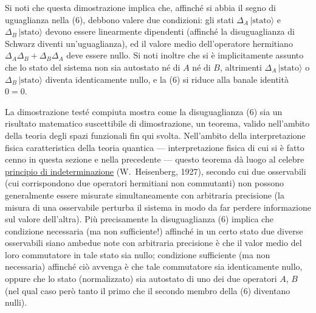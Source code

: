 \documentclass[11pt, a4paper]{book}
\numberwithin{equation}{section}
\begin{document}
Si noti che questa dimostrazione implica che, affinché si abbia
il segno di uguaglianza nella (6), debbono valere due condizioni: gli
stati $\Delta_A\,|\text{stato}\rangle$ e $\Delta_B\,|\text{stato}\rangle$ devono essere linearmente dipendenti
(affinché la disuguaglianza di Schwarz diventi un'uguaglianza), ed il valore medio dell'operatore hermitiano $\Delta_A \Delta_B + \Delta_B \Delta_A$ deve essere
nullo. Si noti inoltre che si è implicitamente assunto che lo stato del sistema non sia autostato né di $A$ né di $B$, altrimenti $\Delta_A\,|\text{stato}\rangle$ o
$\Delta_B\,|\text{stato}\rangle$ diventa identicamente nullo, e la (6) si riduce alla banale
identità $0 = 0$.


La dimostrazione testé compiuta mostra come la disuguaglianza (6) sia un risultato matematico suscettibile di dimostrazione, un
teorema, valido nell'ambito della teoria degli spazi funzionali fin qui
svolta. Nell'ambito della interpretazione fisica caratteristica della teoria quantica --- interpretazione fisica di cui si è fatto cenno in questa
sezione e nella precedente --- questo teorema dà luogo al celebre \underline{principio
di indeterminazione} (W.\ Heisenberg, 1927), secondo cui due osservabili
(cui corrispondono due operatori hermitiani non commutanti) non possono
generalmente essere misurate simultaneamente con arbitraria precisione
(la misura di una osservabile perturba il sistema in modo da far perdere
informazione sul valore dell'altra). Più precisamente la disuguaglianza (6)
implica che condizione necessaria (ma non sufficiente!) affinché in un certo stato due diverse osservabili siano ambedue note con arbitraria precisione è che il valor medio del loro commutatore in tale stato sia nullo; condizione sufficiente (ma non necessaria) affinché ciò avvenga è che tale commutatore sia identicamente nullo, oppure che lo stato (normalizzato) sia
autostato di uno dei due operatori $A$, $B$ (nel qual caso però tanto il primo
che il secondo membro della (6) diventano nulli).
\end{document}
